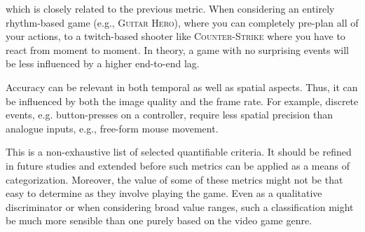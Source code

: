  which is closely related to the previous metric. When considering an entirely rhythm-based game (e.g., \textsc{Guitar Hero}), where you can completely pre-plan all of your actions, to a twitch-based shooter like \textsc{Counter-Strike} where you have to react from moment to moment. In theory, a game with no surprising events will be less influenced by a higher end-to-end lag.

 Accuracy can be relevant in both temporal as well as spatial aspects.
    Thus, it can be influenced by both the image quality and the frame rate.
    For example, discrete events, e.g. button-presses on a controller, require less spatial precision than analogue inputs, e.g., free-form mouse movement.


This is a non-exhaustive list of selected quantifiable criteria.
It should be refined in future studies and extended before such metrics can be applied as a means of categorization.
Moreover, the value of some of these metrics might not be that easy to determine as they involve playing the game. Even as a qualitative discriminator or when considering broad value ranges, such a classification might be much more sensible than one purely based on the video game genre.
